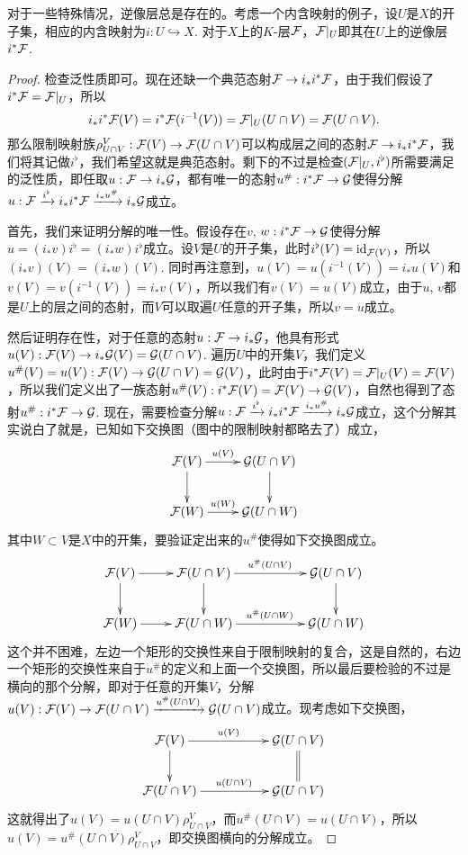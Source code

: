 \begin{pro}
\label{pro:1}对于一些特殊情况，逆像层总是存在的。考虑一个内含映射的例子，设$U$是$X$的开子集，相应的内含映射为$i:U\hookrightarrow X$. 对于$X$上的$K$-层$\mathcal{F}$，$\mathcal{F}|_U$即其在$U$上的逆像层$i^*\mathcal{F}$.
\end{pro}

\begin{proof}
检查泛性质即可。现在还缺一个典范态射$\mathcal{F}\to i_*i^*\mathcal{F}$，由于我们假设了$i^*\mathcal{F}=\mathcal{F}|_U$，所以
\[
	i_*i^*\mathcal{F}(V)=i^*\mathcal{F}(i^{-1}(V))=\mathcal{F}|_U(U\cap V)=\mathcal{F}(U\cap V).
\]
那么限制映射族$\rho^V_{U\cap V}:\mathcal{F}(V)\to \mathcal{F}(U\cap V)$可以构成层之间的态射$\mathcal{F}\to i_*i^*\mathcal{F}$，我们将其记做$i^\flat$，我们希望这就是典范态射。剩下的不过是检查$(\mathcal{F}|_U,i^\flat)$所需要满足的泛性质，即任取$u:\mathcal{F}\to i_*\mathcal{G}$，都有唯一的态射$u^\#:i^*\mathcal{F}\to \mathcal{G}$使得分解$u:\mathcal{F}\xrightarrow{i^\flat} i_*i^*\mathcal{F} \xrightarrow{i_*u^\#} i_*\mathcal{G}$成立。

首先，我们来证明分解的唯一性。假设存在$v$, $w:i^*\mathcal{F}\to \mathcal{G}$使得分解$u=(i_*v)i^\flat=(i_*w)i^\flat$成立。设$V$是$U$的开子集，此时$i^\flat(V)=\operatorname{id}_{\mathcal{F}(V)}$，所以$(i_*v)(V)=(i_*w)(V)$. 同时再注意到，$u(V)=u(i^{-1}(V))=i_*u(V)$和$v(V)=v(i^{-1}(V))=i_*v(V)$，所以我们有$v(V)=u(V)$成立，由于$u$, $v$都是$U$上的层之间的态射，而$V$可以取遍$U$任意的开子集，所以$v=u$成立。

然后证明存在性，对于任意的态射$u:\mathcal{F}\to i_*\mathcal{G}$，他具有形式$u(V):\mathcal{F}(V)\to i_*\mathcal{G}(V)=\mathcal{G}(U\cap V)$. 遍历$U$中的开集$V$，我们定义$u^\#(V)=u(V):\mathcal{F}(V)\to \mathcal{G}(U\cap V)=\mathcal{G}(V)$，此时由于$i^*\mathcal{F}(V)=\mathcal{F}|_U(V)=\mathcal{F}(V)$，所以我们定义出了一族态射$u^\#(V):i^*\mathcal{F}(V)=\mathcal{F}(V)\to \mathcal{G}(V)$，自然也得到了态射$u^\#:i^*\mathcal{F}\to \mathcal{G}$. 现在，需要检查分解$u:\mathcal{F}\xrightarrow{i^\flat} i_*i^*\mathcal{F} \xrightarrow{i_*u^\#} i_*\mathcal{G}$成立，这个分解其实说白了就是，已知如下交换图（图中的限制映射都略去了）成立，
\[
	\xymatrix{
		\calf(V)\ar[r]^-{u(V)} \ar[d]&\calg(U\cap V) \ar[d]\\
		\calf(W)\ar[r]^-{u(W)}&\calg(U\cap W)
	}
\]
其中$W\subset V$是$X$中的开集，要验证定出来的$u^\#$使得如下交换图成立。
\[
	\xymatrix{
		\calf(V)\ar[r] \ar[d]&\ar[rr]^{u^\#(U\cap V)}\calf(U\cap V) \ar[d]&&\calg(U\cap V) \ar[d]\\
		\calf(W)\ar[r]&\ar[rr]^{u^\#(U\cap W)}\calf(U\cap W)&&\calg(U\cap W)
	}
\]
这个并不困难，左边一个矩形的交换性来自于限制映射的复合，这是自然的，右边一个矩形的交换性来自于$u^\#$的定义和上面一个交换图，所以最后要检验的不过是横向的那个分解，即对于任意的开集$V$，分解$u(V):\mathcal{F}(V)\to \mathcal{F}(U\cap V) \xrightarrow{u^\#(U\cap V)} \mathcal{G}(U\cap V)$成立。现考虑如下交换图，
\[
	\xymatrix{
		\calf(V)\ar[rr]^-{u(V)} \ar[d]&&\calg(U\cap V) \ar@{=}[d]\\
		\calf(U\cap V)\ar[rr]^{u(U\cap V)}&&\calg(U\cap V)
	}
\]
这就得出了$u(V)=u(U\cap V)\rho^V_{U\cap V}$，而$u^\#(U\cap V)=u(U\cap V)$，所以$u(V)=u^\#(U\cap V)\rho^V_{U\cap V}$，即交换图横向的分解成立。
\end{proof}

